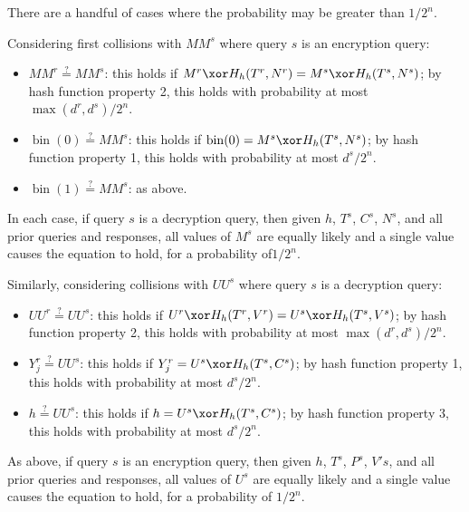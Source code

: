 \documentclass[letterpaper,11pt]{article}
\newcommand*{\MM}{\mathit{MM}}
\newcommand*{\qeq}{\stackrel{\text{?}}{=}}
\newcommand*{\UU}{\mathit{UU}}
\DeclareMathOperator{\fromint}{bin}
\begin{document}
There are a handful of cases where the probability may
be greater than \(1/2^n\).

Considering first collisions with \(\MM^s\) where
query \(s\) is an encryption query:

\begin{itemize}
    \item \(\MM^r \qeq \MM^s\):
    this holds if \(M^r \xor H_h(T^r, N^r) = M^s \xor H_h(T^s, N^s)\);
    by hash function property 2, this holds with probability at most
    \(\max(d^r, d^s)/2^n\).
    \item \(\fromint(0) \qeq \MM^s\):
    this holds if \(\fromint(0) = M^s \xor H_h(T^s, N^s)\);
    by hash function property 1, this holds with probability at most
    \(d^s/2^n\).
    \item \(\fromint(1) \qeq \MM^s\): as above.
\end{itemize}

In each case, if query \(s\) is a decryption query,
then given \(h\), \(T^s\), \(C^s\), \(N^s\),
and all prior queries and responses,
all values of \(M^s\) are equally likely 
and a single value causes the equation to hold,
for a probability of\(1/2^n\).

Similarly, considering collisions with \(\UU^s\) where
query \(s\) is a decryption query:

\begin{itemize}
    \item \(\UU^r \qeq \UU^s\): 
    this holds if \(U^r \xor H_h(T^r, V^r) = U^s \xor H_h(T^s, V^s)\);
    by hash function property 2, this holds with probability at most
    \(\max(d^r, d^s)/2^n\).
    \item \(Y_j^r \qeq \UU^s\):
    this holds if \(Y_j^r = U^s \xor H_h(T^s, C^s)\);
    by hash function property 1, this holds with probability at most
    \(d^s/2^n\).
    \item \(h \qeq \UU^s\):
    this holds if \(h = U^s \xor H_h(T^s, C^s)\);
    by hash function property 3, this holds with probability at most
    \(d^s/2^n\).
\end{itemize}

As above, if query \(s\) is an encryption query,
then given \(h\), \(T^s\), \(P^s\), \(V's\),
and all prior queries and responses,
all values of \(U^s\) are equally likely
and a single value causes the equation to hold,
for a probability of \(1/2^n\).
\end{document}
